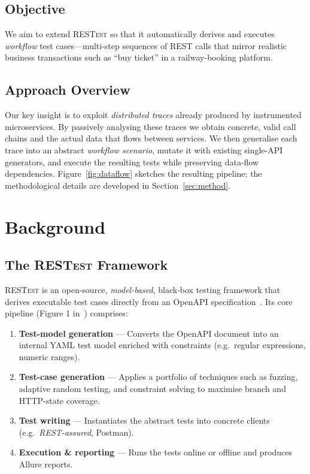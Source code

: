 \documentclass[conference]{IEEEtran}
\begin{document}
\subsection*{Objective}
We aim to extend \textsc{RESTest} so that it automatically derives and
executes \emph{workflow} test cases—multi-step sequences of REST calls
that mirror realistic business transactions such as “buy ticket” in a
railway-booking platform.

\subsection*{Approach Overview}
Our key insight is to exploit \emph{distributed traces} already
produced by instrumented microservices.  By passively analysing these
traces we obtain concrete, valid call chains and the actual data that
flows between services.  We then generalise each trace into an
abstract \emph{workflow scenario}, mutate it with existing single-API
generators, and execute the resulting tests while preserving data-flow
dependencies.  Figure~\ref{fig:dataflow} sketches the resulting
pipeline; the methodological details are developed in
Section~\ref{sec:method}.




\section{Background}


\subsection{The \textsc{RESTest} Framework}\label{sec:restest}
\textsc{RESTest} is an open-source, \emph{model-based}, black-box
testing framework that derives executable test cases directly from an
OpenAPI specification~\cite{martin2019restest}.  
Its core pipeline (Figure 1 in~\cite{martin2019restest}) comprises:

\begin{enumerate}[leftmargin=*,label=\arabic*)]
  \item \textbf{Test-model generation} — Converts the OpenAPI document
        into an internal YAML test model enriched with
        constraints (e.g.\ regular expressions, numeric ranges).
  \item \textbf{Test-case generation} — Applies a portfolio of
        techniques such as fuzzing, adaptive random testing, and
        constraint solving to maximise branch and HTTP-state coverage.
  \item \textbf{Test writing} — Instantiates the abstract tests into
        concrete clients (e.g.\ \textit{REST-assured}, Postman).
  \item \textbf{Execution \& reporting} — Runs the tests online or
        offline and produces Allure reports.
\end{enumerate}
\end{document}
